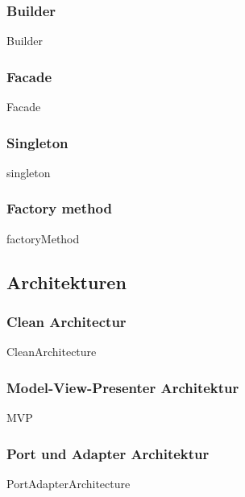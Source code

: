\documentclass{article}
\begin{document}
        \subsubsection{Builder}
        \label{kap:gof:builder}
            {Builder}

        \subsubsection{Facade}
        \label{kap:gof:facade}
            {Facade}

        \subsubsection{Singleton}
        \label{kap:gof:singleton}
            {singleton}

        \subsubsection{Factory method}
        \label{kap:gof:factory}
            {factoryMethod}
            

    \subsection{Architekturen}
        \subsubsection{Clean Architectur}
            {CleanArchitecture}
        \newpage
        \subsubsection{Model-View-Presenter Architektur}
        \label{kap:MVC}
            {MVP}
        
        \newpage
        \subsubsection{Port und Adapter Architektur}
        \label{kap:PortAdapterArchitecture}
            {PortAdapterArchitecture}
\end{document}
